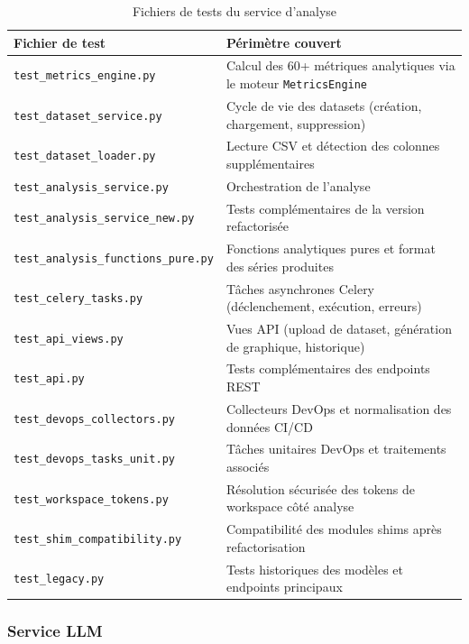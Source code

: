 \begin{table}[H]
\centering
\small
\caption{Fichiers de tests du service d'analyse}
\label{tab:tests-analyze}
\begin{tabular}{|>{\raggedright\arraybackslash}p{6cm}
                |>{\raggedright\arraybackslash}p{7cm}|}
\hline
\textbf{Fichier de test} & \textbf{Périmètre couvert} \\
\hline
\texttt{test\_metrics\_engine.py} & Calcul des 60+ métriques analytiques via le moteur \texttt{MetricsEngine} \\
\hline
\texttt{test\_dataset\_service.py} & Cycle de vie des datasets (création, chargement, suppression) \\
\hline
\texttt{test\_dataset\_loader.py} & Lecture CSV et détection des colonnes supplémentaires \\
\hline
\texttt{test\_analysis\_service.py} & Orchestration de l'analyse \\
\hline
\texttt{test\_analysis\_service\_new.py} & Tests complémentaires de la version refactorisée \\
\hline
\texttt{test\_analysis\_functions\_pure.py} & Fonctions analytiques pures et format des séries produites \\
\hline
\texttt{test\_celery\_tasks.py} & Tâches asynchrones Celery (déclenchement, exécution, erreurs) \\
\hline
\texttt{test\_api\_views.py} & Vues API (upload de dataset, génération de graphique, historique) \\
\hline
\texttt{test\_api.py} & Tests complémentaires des endpoints REST \\
\hline
\texttt{test\_devops\_collectors.py} & Collecteurs DevOps et normalisation des données CI/CD \\
\hline
\texttt{test\_devops\_tasks\_unit.py} & Tâches unitaires DevOps et traitements associés \\
\hline
\texttt{test\_workspace\_tokens.py} & Résolution sécurisée des tokens de workspace côté analyse \\
\hline
\texttt{test\_shim\_compatibility.py} & Compatibilité des modules shims après refactorisation \\
\hline
\texttt{test\_legacy.py} & Tests historiques des modèles et endpoints principaux \\
\hline
\end{tabular}
\end{table}

\subsubsection*{Service LLM}

